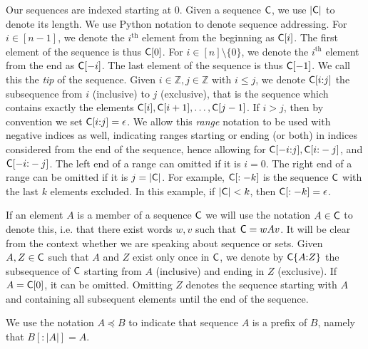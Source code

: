 Our sequences are indexed starting at $0$. Given a sequence $\mathsf{C}$, we use
$|\mathsf{C}|$ to denote its length. We use Python notation to denote sequence
addressing. For $i \in [n - 1]$, we denote the $i^\text{th}$ element from the
beginning as $\mathsf{C}[i]$. The first element of the sequence is thus $\mathsf{C}[0]$.
For $i \in [n] \setminus \{0\}$, we denote the $i^\text{th}$ element from the
end as $\mathsf{C}[-i]$. The last element of the sequence is thus $\mathsf{C}[-1]$. We
call this the \emph{tip} of the sequence. Given $i \in \mathbb{Z},
j \in \mathbb{Z}$ with $i \leq j$, we denote $\mathsf{C}[i{:}j]$ the subsequence from
$i$ (inclusive) to $j$ (exclusive), that is the sequence which contains exactly
the elements $\mathsf{C}[i], \mathsf{C}[i + 1], \dots, \mathsf{C}[j - 1]$. If $i > j$, then
by convention we set $\mathsf{C}[i{:}j] = \epsilon$. We allow this \emph{range}
notation to be used with negative indices as well, indicating ranges starting or
ending (or both) in indices considered from the end of the sequence, hence
allowing for $\mathsf{C}[-i{:}j], \mathsf{C}[i{:}-j]$, and $\mathsf{C}[-i{:}-j]$. The left end of
a range can omitted if it is $i = 0$. The right end of a range can be omitted if
it is $j = |\mathsf{C}|$. For example, $\mathsf{C}[:-k]$ is the sequence $\mathsf{C}$ with
the last $k$ elements excluded. In this example, if $|\mathsf{C}| < k$, then
$\mathsf{C}[:-k] = \epsilon$.

If an element $A$ is a member of a sequence $\mathsf{C}$ we will use the notation $A
\in \mathsf{C}$ to denote this, i.e. that there exist words $w, v$ such that $\mathsf{C}
= wAv$. It will be clear from the context whether we are speaking about sequence
or sets. Given $A, Z \in \mathsf{C}$ such that $A$ and $Z$ exist only once in
$\mathsf{C}$, we denote by $\mathsf{C}\{A{:}Z\}$ the subsequence of $\mathsf{C}$ starting from
$A$ (inclusive) and ending in $Z$ (exclusive). If $A = \mathsf{C}[0]$, it can be
omitted. Omitting $Z$ denotes the sequence starting with $A$ and containing all
subsequent elements until the end of the sequence.

We use the notation $A \preceq B$ to indicate that sequence $A$ is a prefix of
$B$, namely that $B[{:}|A|] = A$.

